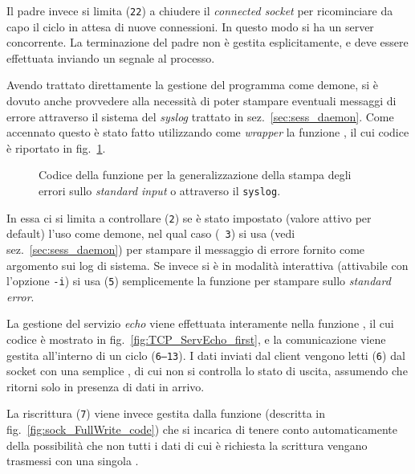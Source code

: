 Il padre invece si limita (\texttt{\small 22}) a chiudere il \textit{connected
  socket} per ricominciare da capo il ciclo in attesa di nuove connessioni. In
questo modo si ha un server concorrente. La terminazione del padre non è
gestita esplicitamente, e deve essere effettuata inviando un segnale al
processo.

Avendo trattato direttamente la gestione del programma come demone, si è
dovuto anche provvedere alla necessità di poter stampare eventuali messaggi di
errore attraverso il sistema del \textit{syslog} trattato in
sez.~\ref{sec:sess_daemon}. Come accennato questo è stato fatto utilizzando
come \textit{wrapper} la funzione , il cui codice è riportato
in fig.~\ref{fig:TCP_PrintErr}.

\begin{figure}[!htb]
  \footnotesize \centering
  \begin{minipage}[c]{\codesamplewidth}
  \end{minipage} 
  \normalsize
  \caption{Codice della funzione  per la generalizzazione della
    stampa degli errori sullo \textit{standard input} o attraverso il
    \texttt{syslog}.}
  \label{fig:TCP_PrintErr}
\end{figure}


In essa ci si limita a controllare (\texttt{\small 2}) se è stato impostato
(valore attivo per default) l'uso come demone, nel qual caso (\texttt{\small
  3}) si usa  (vedi sez.~\ref{sec:sess_daemon}) per stampare il
messaggio di errore fornito come argomento sui log di sistema. Se invece si è
in modalità interattiva (attivabile con l'opzione \texttt{-i}) si usa
(\texttt{\small 5}) semplicemente la funzione  per stampare sullo
\textit{standard error}.

La gestione del servizio \textit{echo} viene effettuata interamente nella
funzione , il cui codice è mostrato in
fig.~\ref{fig:TCP_ServEcho_first}, e la comunicazione viene gestita all'interno
di un ciclo (\texttt{\small 6--13}).  I dati inviati dal client vengono letti
(\texttt{\small 6}) dal socket con una semplice , di cui non si
controlla lo stato di uscita, assumendo che ritorni solo in presenza di dati
in arrivo. 

La riscrittura (\texttt{\small 7}) viene invece gestita dalla funzione
 (descritta in fig.~\ref{fig:sock_FullWrite_code}) che si
incarica di tenere conto automaticamente della possibilità che non tutti i
dati di cui è richiesta la scrittura vengano trasmessi con una singola
.

